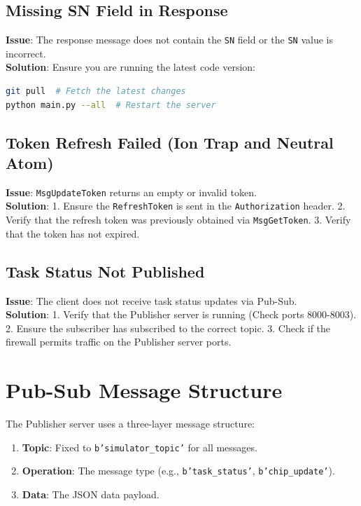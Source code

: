 \documentclass[UTF8, a4paper, 12pt]{article}
\begin{document}
\subsection{Missing SN Field in Response}
\textbf{Issue}: The response message does not contain the \texttt{SN} field or the \texttt{SN} value is incorrect.\\
\textbf{Solution}: Ensure you are running the latest code version:
\begin{lstlisting}[language=bash]
git pull  # Fetch the latest changes
python main.py --all  # Restart the server
\end{lstlisting}

\subsection{Token Refresh Failed (Ion Trap and Neutral Atom)}
\textbf{Issue}: \texttt{MsgUpdateToken} returns an empty or invalid token.\\
\textbf{Solution}:
1. Ensure the \texttt{RefreshToken} is sent in the \texttt{Authorization} header.
2. Verify that the refresh token was previously obtained via \texttt{MsgGetToken}.
3. Verify that the token has not expired.

\subsection{Task Status Not Published}
\textbf{Issue}: The client does not receive task status updates via Pub-Sub.\\
\textbf{Solution}:
1. Verify that the Publisher server is running (Check ports 8000-8003).
2. Ensure the subscriber has subscribed to the correct topic.
3. Check if the firewall permits traffic on the Publisher server ports.

\section{Pub-Sub Message Structure}

The Publisher server uses a three-layer message structure:
\begin{enumerate}
    \item \textbf{Topic}: Fixed to \texttt{b'simulator\_topic'} for all messages.
    \item \textbf{Operation}: The message type (e.g., \texttt{b'task\_status'}, \texttt{b'chip\_update'}).
    \item \textbf{Data}: The JSON data payload.
\end{enumerate}
\end{document}
